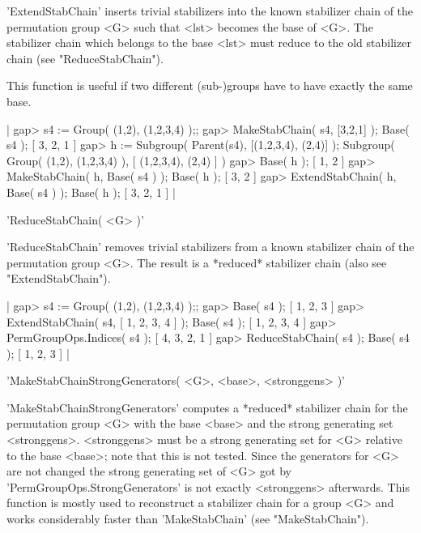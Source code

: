 'ExtendStabChain' inserts  trivial  stabilizers into the known stabilizer
chain of  the permutation group <G> such  that <lst>  becomes the base of
<G>.  The stabilizer chain which belongs to the base <lst> must reduce to
the old stabilizer chain (see "ReduceStabChain").

This function   is useful if  two  different  (sub-)groups  have  to have
exactly the same base.

|    gap> s4 := Group( (1,2), (1,2,3,4) );;
    gap> MakeStabChain( s4, [3,2,1] );  Base( s4 );
    [ 3, 2, 1 ]
    gap> h := Subgroup( Parent(s4), [(1,2,3,4), (2,4)] );
    Subgroup( Group( (1,2), (1,2,3,4) ), [ (1,2,3,4), (2,4) ] )
    gap> Base( h );
    [ 1, 2 ]
    gap> MakeStabChain( h, Base( s4 ) );  Base( h );
    [ 3, 2 ]
    gap> ExtendStabChain( h, Base( s4 ) );  Base( h );
    [ 3, 2, 1 ] |


'ReduceStabChain( <G> )'

'ReduceStabChain'  removes  trivial stabilizers  from a known  stabilizer
chain of the permutation group <G>.  The result is a *reduced* stabilizer
chain (also see "ExtendStabChain").

|    gap> s4 := Group( (1,2), (1,2,3,4) );;
    gap> Base( s4 );
    [ 1, 2, 3 ]
    gap> ExtendStabChain( s4, [ 1, 2, 3, 4 ] );  Base( s4 );
    [ 1, 2, 3, 4 ]
    gap> PermGroupOps.Indices( s4 );
    [ 4, 3, 2, 1 ]
    gap> ReduceStabChain( s4 );  Base( s4 );
    [ 1, 2, 3 ] |


'MakeStabChainStrongGenerators( <G>, <base>, <stronggens> )'

'MakeStabChainStrongGenerators' computes a *reduced* stabilizer chain for
the permutation group <G> with the base <base>  and the strong generating
set <stronggens>.   <stronggens> must be  a strong generating set for <G>
relative to  the base <base>; note that this  is  not tested.  Since  the
generators for <G> are not  changed the strong generating set of <G>  got
by    'PermGroupOps.StrongGenerators'   is   not   exactly   <stronggens>
afterwards.  This  function is  mostly used to  reconstruct a  stabilizer
chain for a  group <G> and works considerably faster than 'MakeStabChain'
(see "MakeStabChain").

